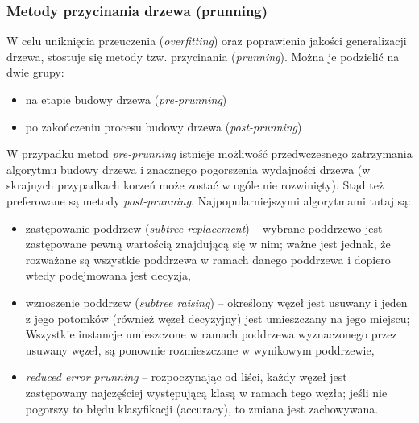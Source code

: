    \subsubsection*{Metody przycinania drzewa (prunning)}
    W celu uniknięcia przeuczenia (\textit{overfitting}) oraz poprawienia jakości generalizacji drzewa, stostuje się
    metody tzw. przycinania (\textit{prunning}). Można je podzielić na dwie grupy:
    \begin{itemize}
      \item{na etapie budowy drzewa (\textit{pre-prunning})}
      \item{po zakończeniu procesu budowy drzewa (\textit{post-prunning})}
    \end{itemize}
    W przypadku metod \textit{pre-prunning} istnieje możliwość przedwczesnego zatrzymania algorytmu budowy drzewa
    i znacznego pogorszenia wydajności drzewa (w skrajnych przypadkach korzeń może zostać w ogóle nie rozwinięty).
    Stąd też preferowane są metody \textit{post-prunning}. Najpopularniejszymi algorytmami tutaj są:
    \begin{itemize}
      \item{zastępowanie poddrzew (\textit{subtree replacement}) -- wybrane poddrzewo jest zastępowane pewną wartością 
            znajdującą się w nim; ważne jest jednak, że rozważane są wszystkie poddrzewa w ramach danego poddrzewa 
            i dopiero wtedy podejmowana jest decyzja,}
      \item{wznoszenie poddrzew (\textit{subtree raising}) -- określony węzeł jest usuwany i jeden z jego potomków 
            (również węzeł decyzyjny) jest umieszczany na jego miejscu; Wszystkie instancje umieszczone w ramach 
            poddrzewa wyznaczonego przez usuwany węzeł, są ponownie rozmieszczane w wynikowym poddrzewie,}

      \item{\textit{reduced error prunning} -- rozpoczynając od liści, każdy węzeł jest zastępowany najczęściej występującą klasą
            w ramach tego węzła; jeśli nie pogorszy to błędu klasyfikacji (accuracy), to zmiana jest zachowywana.}
    \end{itemize}
